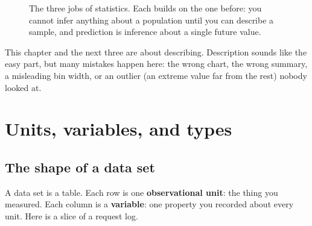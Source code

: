 \begin{figure}[H]
\centering
{}
\caption{The three jobs of statistics. Each builds on the one before: you cannot infer
anything about a population until you can describe a sample, and prediction is inference
about a single future value.}
\label{fig:data-three-jobs}
\end{figure}

This chapter and the next three are about describing. Description sounds like the easy part,
but many mistakes happen here: the wrong chart, the wrong summary, a
misleading bin width, or an outlier (an extreme value far from the rest) nobody looked at.

\section{Units, variables, and types}
\label{sec:data-variables}

\subsection{The shape of a data set}

A data set is a table. Each row is one \textbf{observational unit}: the thing you measured. Each
column is a \textbf{variable}: one property you recorded about every unit. Here is a slice of a
request log.

